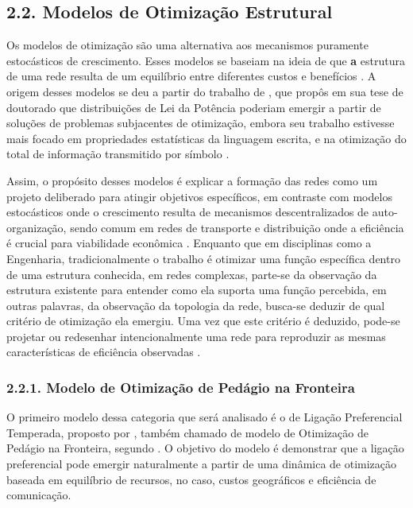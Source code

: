 \documentclass[12pt,oneside,a4paper,brazil,sumario=tradicional]{abntex2}
\begin{document}
\subsection*{2.2. Modelos de Otimização Estrutural}
Os modelos de otimização são uma alternativa aos mecanismos puramente estocásticos de crescimento.  Esses modelos se baseiam na ideia de que\textbf{ a }estrutura de uma rede resulta de um equilíbrio entre diferentes custos e benefícios \cite{latora2017}. A origem desses modelos se deu a partir do trabalho de , que propôs em sua tese de doutorado que distribuições de Lei da Potência poderiam emergir a partir de soluções de problemas subjacentes de otimização, embora seu trabalho estivesse mais focado em propriedades estatísticas da linguagem escrita, e na otimização do total de informação transmitido por símbolo \cite{dsouza2007}.

Assim, o propósito desses modelos é explicar a formação das redes como um projeto deliberado para atingir objetivos específicos, em contraste com modelos estocásticos onde o crescimento resulta de mecanismos descentralizados de auto-organização, sendo comum em redes de transporte e distribuição onde a eficiência é crucial para viabilidade econômica \cite{newman2010}. Enquanto que em disciplinas como a Engenharia, tradicionalmente o trabalho é otimizar uma função específica dentro de uma estrutura conhecida, em redes complexas, parte-se da observação da estrutura existente para entender como ela suporta uma função percebida, em outras palavras, da observação da topologia da rede, busca-se deduzir de qual critério de otimização ela emergiu. Uma vez que este critério é deduzido, pode-se projetar ou redesenhar intencionalmente uma rede para reproduzir as mesmas características de eficiência observadas \cite{souza2012}.

\subsubsection*{2.2.1. Modelo de Otimização de Pedágio na Fronteira}
O primeiro modelo dessa categoria que será analisado é o de Ligação Preferencial Temperada, proposto por , também chamado de modelo de Otimização de Pedágio na Fronteira, segundo . O objetivo do modelo é demonstrar que a ligação preferencial pode emergir naturalmente a partir de uma dinâmica de otimização baseada em equilíbrio de recursos, no caso, custos geográficos e eficiência de comunicação.
\end{document}
